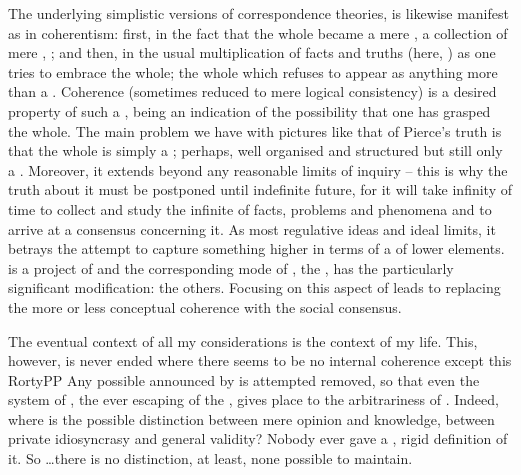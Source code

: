  The  underlying
simplistic versions of correspondence theories, is likewise manifest as
 in coherentism: first, in the fact that the whole
became a mere , a collection of mere , ; and
then, in the usual multiplication of facts and truths (here, ) as one
tries to embrace the whole; the whole which refuses to appear as anything more
than a .  Coherence (sometimes reduced to mere logical consistency)
is a desired property of such a , being an indication of the
possibility that one has  grasped the whole.
The main problem we have with pictures like that of Pierce's truth is that the
whole is simply a ; perhaps, well organised and structured but
still only a . Moreover, it extends beyond any reasonable limits of
inquiry -- this is why the truth about it must be postponed until indefinite
future, for it will take infinity of time to collect and study the infinite
 of facts, problems and phenomena and to arrive at a consensus
concerning it. As most regulative ideas and ideal limits, it betrays the attempt
to capture something higher in terms of a  of lower elements.
 is a project of  and the corresponding mode of
, the , has the particularly
significant modification: the others. Focusing on this aspect of
 leads to replacing the more or less conceptual coherence with
the social consensus.

The eventual context of all my considerations is the context of my life. This,
however, is never ended  where there seems to be no internal
coherence except this \citet{which it happened to obtain at the last turn of
hermeneutical circle.}{RortyPP}{}
Any possible  
announced by  is attempted removed, so that even the system 
of , the ever escaping  of the ,
gives place to the arbitrariness of .  Indeed, where is the
possible distinction between mere opinion and knowledge, 
between private idiosyncrasy and
general validity?  Nobody ever gave a , rigid definition
of it.  So \ldots there is no distinction, at least, none possible to maintain.

